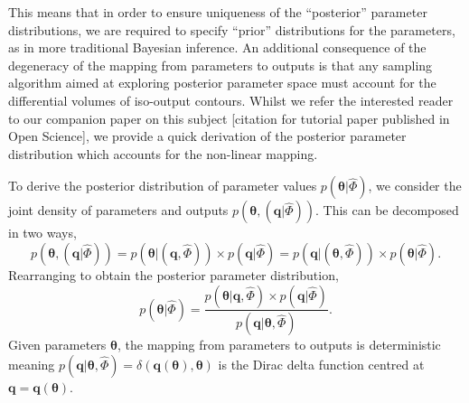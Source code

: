 
This means that in order to ensure uniqueness of the ``posterior'' parameter distributions, we are required to specify ``prior'' distributions for the parameters, as in more traditional Bayesian inference. An additional consequence of the degeneracy of the mapping from parameters to outputs is that any sampling algorithm aimed at exploring posterior parameter space must account for the differential volumes of iso-output contours. Whilst we refer the interested reader to our companion paper on this subject [citation for tutorial paper published in Open Science], we provide a quick derivation of the posterior parameter distribution which accounts for the non-linear mapping.

To derive the posterior distribution of parameter values $p(\boldsymbol{\theta}|\hat{\Phi})$, we consider the joint density of parameters and outputs $p(\boldsymbol{\theta},(\boldsymbol{q}|\hat{\Phi}))$. This can be decomposed in two ways,
%
\begin{equation}\label{eq:joint}
  p( \boldsymbol{\theta}, (\boldsymbol{q}|\hat{\Phi}) )
= p( \boldsymbol{\theta}|(\boldsymbol{q}, \hat{\Phi}) ) \times p(\boldsymbol{q}|\hat{\Phi})
= p( \boldsymbol{q}|(\boldsymbol{\theta}, \hat{\Phi}) ) \times p(\boldsymbol{\theta}|\hat{\Phi}).
\end{equation}
%
Rearranging to obtain the posterior parameter distribution,
%
\begin{equation}
p(\boldsymbol{\theta}|\hat{\Phi})
= \frac{p(\boldsymbol{\theta}|\boldsymbol{q}, \hat{\Phi}) \times p(\boldsymbol{q}|\hat{\Phi})}{p(\boldsymbol{q}| \boldsymbol{\theta}, \hat{\Phi})}.
\end{equation}
%
Given parameters $\boldsymbol{\theta}$, the mapping from parameters to outputs is deterministic meaning
$p(\boldsymbol{q}| \boldsymbol{\theta}, \hat{\Phi})=\delta(\boldsymbol{q}(\boldsymbol{\theta}),\boldsymbol{\theta})$ is the Dirac delta function centred at $\boldsymbol{q}=\boldsymbol{q}(\boldsymbol{\theta})$.


